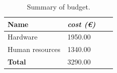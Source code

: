 \begin{table}[ht]
  \centering
  \caption{Summary of budget.}\label{tab:budget}
  \begin{tabular}{llll}
    \toprule
      \textbf{Name} & \emph{cost (\euro)}\\
    \midrule
	  Hardware & 1950.00\\
      Human resources & 1340.00\\
    \bottomrule
      \textbf{Total} & 3290.00\\
  \end{tabular}
\end{table}